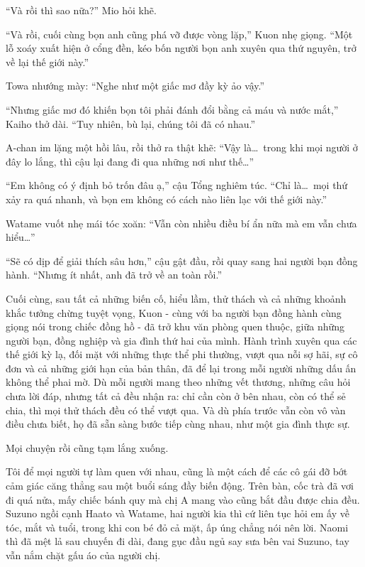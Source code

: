 \documentclass[../main.tex]{subfiles}
\begin{document}
``Và rồi thì sao nữa?'' Mio hỏi khẽ.

``Và rồi, cuối cùng bọn anh cũng phá vỡ được vòng lặp,'' Kuon nhẹ giọng. ``Một lỗ xoáy xuất hiện ở cổng đền, kéo bốn người bọn anh xuyên qua thứ nguyên, trở về lại thế giới này.''

Towa nhướng mày: ``Nghe như một giấc mơ đầy kỳ ảo vậy.''

``Nhưng giấc mơ đó khiến bọn tôi phải đánh đổi bằng cả máu và nước mắt,'' Kaiho thở dài. ``Tuy nhiên, bù lại, chúng tôi đã có nhau.''

A-chan im lặng một hồi lâu, rồi thở ra thật khẽ: ``Vậy là\dots\ trong khi mọi người ở đây lo lắng, thì cậu lại đang đi qua những nơi như thế\dots''

``Em không có ý định bỏ trốn đâu ạ,'' cậu Tổng nghiêm túc. ``Chỉ là\dots\ mọi thứ xảy ra quá nhanh, và bọn em không có cách nào liên lạc với thế giới này.''

Watame vuốt nhẹ mái tóc xoăn: ``Vẫn còn nhiều điều bí ẩn nữa mà em vẫn chưa hiểu\dots''

``Sẽ có dịp để giải thích sâu hơn,'' cậu gật đầu, rồi quay sang hai người bạn đồng hành. ``Nhưng ít nhất, anh đã trở về an toàn rồi.''

Cuối cùng, sau tất cả những biến cố, hiểu lầm, thử thách và cả những khoảnh khắc tưởng chừng tuyệt vọng, Kuon - cùng với ba người bạn đồng hành cùng giọng nói trong chiếc đồng hồ - đã trở khu văn phòng quen thuộc, giữa những người bạn, đồng nghiệp và gia đình thứ hai của mình. Hành trình xuyên qua các thế giới kỳ lạ, đối mặt với những thực thể phi thường, vượt qua nỗi sợ hãi, sự cô đơn và cả những giới hạn của bản thân, đã để lại trong mỗi người những dấu ấn không thể phai mờ. Dù mỗi người mang theo những vết thương, những câu hỏi chưa lời đáp, nhưng tất cả đều nhận ra: chỉ cần còn ở bên nhau, còn có thể sẻ chia, thì mọi thử thách đều có thể vượt qua. Và dù phía trước vẫn còn vô vàn điều chưa biết, họ đã sẵn sàng bước tiếp cùng nhau, như một gia đình thực sự.


Mọi chuyện rồi cũng tạm lắng xuống.

Tôi để mọi người tự làm quen với nhau, cũng là một cách để các cô gái đỡ bớt cảm giác căng thẳng sau một buổi sáng đầy biến động. Trên bàn, cốc trà đã vơi đi quá nửa, mấy chiếc bánh quy mà chị A mang vào cũng bắt đầu được chia đều. Suzuno ngồi cạnh Haato và Watame, hai người kia thì cứ liên tục hỏi em ấy về tóc, mắt và tuổi, trong khi con bé đỏ cả mặt, ấp úng chẳng nói nên lời. Naomi thì đã mệt lả sau chuyến đi dài, đang gục đầu ngủ say sưa bên vai Suzuno, tay vẫn nắm chặt gấu áo của người chị.
\end{document}
